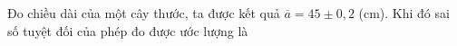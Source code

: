 \begin{ex}
Đo chiều dài của một cây thước, ta được kết quả $\overline a=45\pm0{,}2$ (cm). Khi đó sai số tuyệt đối của phép đo được ước lượng là
\end{ex}
